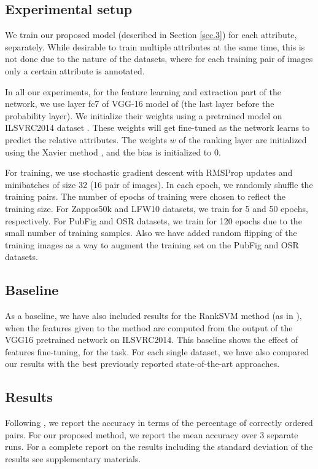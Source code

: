 \subsection{Experimental setup}
We train our proposed model (described in Section \ref{sec.3}) for each attribute, separately. While desirable to train multiple attributes at the same time, this is not done due to the nature of the datasets, where for each training pair of images only a certain attribute is annotated.

In all our experiments, for the feature learning and extraction part of the network, we use layer fc7 of VGG-16 model of \cite{verydeep} (the last layer before the probability layer). We initialize their weights using a pretrained model on ILSVRC2014 dataset \cite{ilsvrc2014}. These weights will get fine-tuned as the network learns to predict the relative attributes. The weights $w$ of the ranking layer are initialized using the Xavier method \cite{glorot}, and the bias is initialized to 0.

For training, we use stochastic gradient descent with RMSProp updates and minibatches of size 32 (16 pair of images). In each epoch, we randomly shuffle the training pairs. The number of epochs of training were chosen to reflect the training size. For Zappos50k and LFW10 datasets, we train for 5 and 50 epochs, respectively. For PubFig and OSR datasets, we train for 120 epochs due to the small number of training samples. Also we have added random flipping of the training images as a way to augment the training set on the PubFig and OSR datasets.

\subsection{Baseline}

As a baseline, we have also included results for the RankSVM method (as in \cite{parikh2011}), when the features given to the method are computed from the output of the VGG16 pretrained network on ILSVRC2014. This baseline shows the effect of features fine-tuning, for the task. For each single dataset, we have also compared our results with the best previously reported state-of-the-art approaches. 

\subsection{Results}

Following \cite{parikh2011, Yu2014, Sandeep_2014_CVPR}, we report the accuracy in terms of the percentage of correctly ordered pairs. For our proposed method, we report the mean accuracy over 3 separate runs. For a complete report on the results including the standard deviation of the results see supplementary materials.

